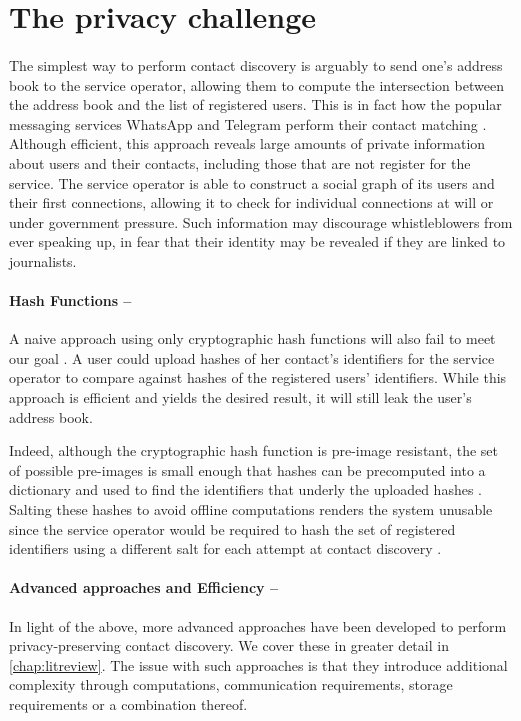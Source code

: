 \section{The privacy challenge}

\paragraph{} The simplest way to perform contact discovery is arguably to send one's address book to the service operator, allowing them to compute the intersection between the address book and the list of registered users. This is in fact how the popular messaging services WhatsApp and Telegram perform their contact matching \cite{Telegram,WhatsApp}. Although efficient, this approach reveals large amounts of private information about  users and their contacts, including those that are not register for the service. The service operator is able to construct a social graph of its users and their first connections, allowing it to check for individual connections at will or under government pressure. Such information may discourage whistleblowers from ever speaking up, in fear that their identity may be revealed if they are linked to journalists.


\paragraph{Hash Functions --}A naive approach using only cryptographic hash functions will also fail to meet our goal \cite{Kales19, Signal:Difficulty}. A user could upload hashes of her contact's identifiers for the service operator to compare against hashes of the registered users' identifiers. While this approach is efficient and yields the desired result, it will still leak the user's address book.

Indeed, although the cryptographic hash function is pre-image resistant, the set of possible pre-images is small enough that hashes can be precomputed into a dictionary and used to find the identifiers that underly the uploaded hashes \cite{Signal:Difficulty}. Salting these hashes to avoid offline computations renders the system unusable since the service operator would be required to hash the set of registered identifiers using a different salt for each attempt at contact discovery \cite{Kales19}.

\paragraph{Advanced approaches and Efficiency --} In light of the above, more advanced approaches have been developed to perform privacy-preserving contact discovery. We cover these in greater detail in \autoref{chap:litreview}. The issue with such approaches is that they introduce additional complexity through computations, communication requirements, storage requirements or a combination thereof.

